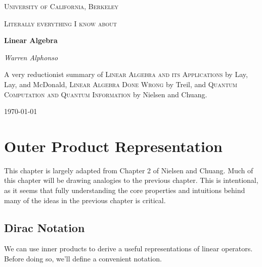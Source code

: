 \documentclass[a4paper,10pt]{book}
\theoremstyle{plain}
\theoremstyle{plain}
\theoremstyle{definition}
\begin{document}
\frontmatter 
{\let\cleardoublepage\clearpage 
\begin{titlepage}
	\centering
	\vspace{1cm}
	{\scshape\LARGE University of California, Berkeley \par}
	\vspace{4cm}
	{\scshape\Large Literally everything I know about \par}
	\vspace{1.5cm}
	{\Huge\bfseries Linear Algebra\par}
	\vspace{1cm}
	\vspace{2.5cm}
	{\Large\itshape Warren Alphonso\par}
	\vfill
	{\large A very reductionist summary of \textsc{Linear Algebra and its Applications} by Lay, Lay, and McDonald, \textsc{Linear Algebra Done Wrong} by Treil, and \textsc{Quantum Computation and Quantum Information} by Nielsen and Chuang. \par}
	\vfill
	{\large \today\par}
\end{titlepage}

\tableofcontents
}

\mainmatter




















\chapter{Outer Product Representation} 

This chapter is largely adapted from Chapter 2 of Nielsen and Chuang. Much of this chapter will be drawing analogies to the previous chapter. This is intentional, as it seems that fully understanding the core properties and intuitions behind many of the ideas in the previous chapter is critical. 

\section{Dirac Notation} 

We can use inner products to derive a useful representations of linear operators. Before doing so, we'll define a convenient notation. 
\end{document}
